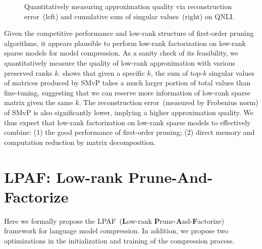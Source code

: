 
\begin{figure}[th]
	\centering
	\caption{Quantitatively measuring approximation quality via reconstruction error~(left) and cumulative sum of singular values~(right) on QNLI.}
	\label{fig:norm}
\end{figure}
Given the competitive performance and low-rank structure of 
first-order pruning algorithms, 
it appears plausible to perform low-rank factorization on 
low-rank sparse models for model compression. 
As a sanity check of its feasibility, we quantitatively measure the 
quality of low-rank approximation with various preserved ranks $k$. 
 shows that given a specific $k$, 
the sum of top-$k$ singular values of matrices produced by SMvP takes a much larger portion of total values than fine-tuning, suggesting that we can reserve more information of low-rank sparse matrix given the same $k$. The reconstruction error~(measured by Frobenius norm) of SMvP is also significantly lower, implying a higher approximation quality. We thus expect that low-rank factorization 
on low-rank sparse models to effectively combine: 
(1) the good performance of first-order pruning; 
(2) direct memory and computation reduction by 
matrix decomposition.

\section{LPAF: Low-rank Prune-And-Factorize}
\label{sec:approach}
Here we formally propose the LPAF~(\textbf{L}ow-rank \textbf{P}rune-\textbf{A}nd-\textbf{F}actorize) framework 
for language model compression. In addition, 
we propose two optimizations in the 
initialization and training of the compression process.

